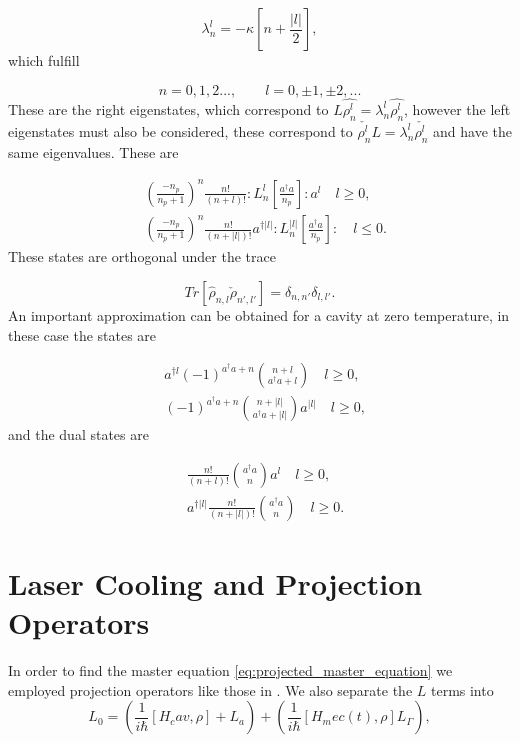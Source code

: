 \documentclass[reprint, amsmath,amssymb, aps,pra]{revtex4-1}
\begin{document}
\begin{equation}
\lambda_n^l = -\kappa[n + \frac{|l|}{2}],
\end{equation} which fulfill

\begin{equation}
n=0,1,2...,\qquad l = 0,\pm 1, \pm 2,... 
\end{equation} These are the right eigenstates, which correspond to $L\hat{\rho_n^l} = \lambda_n^l\hat{\rho_n^l}$, however the left eigenstates must also be considered, these correspond to $\check{\rho_n^l}L = \lambda_n^l\check{\rho_n^l}$ and have the same eigenvalues. These are

\begin{align}\label{DefDBDual}
&(\frac{-n_p}{n_p+1})^n\frac{n!}{(n+l)!}:L_n^l[\frac{a^\dagger a}{n_p}]:a^{l}\quad l \geq 0, \\
&(\frac{-n_p}{n_p+1})^n\frac{n!}{(n+|l|)!}a^{\dagger|l|}:L_n^{|l|}[\frac{a^\dagger a}{n_p}]:\quad l \leq 0.
\end{align} These states are orthogonal under the trace

\begin{equation}
Tr[\hat{\rho}_{n,l}\check{\rho}_{n',l'}] = \delta_{n,n'}\delta_{l,l'}.
\end{equation} An important approximation can be obtained for a cavity at zero temperature, in these case the states are \cite{EnglertDB}

\begin{align}\label{DefDBZero}
&a^{\dagger l}(-1)^{a^\dagger a + n}\binom{n+l}{a^\dagger a+l} \quad l \geq 0, \\
&(-1)^{a^\dagger a + n}\binom{n+|l|}{a^\dagger a+|l|}a^{|l|} \quad l \geq 0,
\end{align} and the dual states are

\begin{align}\label{DefDBDualZero}
&\frac{n!}{(n+l)!}\binom{a^\dagger a}{n}a^l \quad l \geq 0, \\
&a^{\dagger|l|}\frac{n!}{(n+|l|)!}\binom{a^\dagger a}{n} \quad l \geq 0.
\end{align}

\section{Laser Cooling and Projection Operators}\label{CoolingAppendix}

In order to find the master equation
\eqref{eq:projected_master_equation} we employed projection operators
like those in \cite{CarmichaelQO}. We also separate the $L$ terms into
\begin{equation}
L_0= (\frac{1}{i\hbar}[H_cav,\rho]+L_a) +(\frac{1}{i\hbar}[H_mec(t),\rho] L_\Gamma),
\end{equation}
\end{document}
